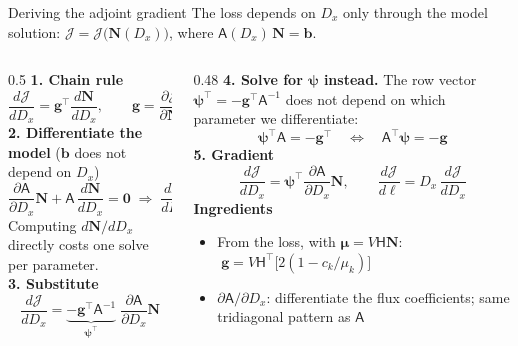 \documentclass[aspectratio=169,10pt]{beamer}
\newcommand{\J}{\mathcal{J}}
\newcommand{\A}{\mathsf{A}}
\newcommand{\N}{\mathbf{N}}
\begin{document}
\begin{frame}{Deriving the adjoint gradient}
\small
The loss depends on $D_x$ only through the model solution: $\J = \J\bigl(\N(D_x)\bigr)$, where $\A(D_x)\,\N = \mathbf{b}$.
\begin{columns}[T]
\begin{column}{0.5\textwidth}
\textbf{1. Chain rule}
\[
\frac{d\J}{dD_x} = \mathbf{g}^{\!\top}\frac{d\N}{dD_x},\qquad \mathbf{g} = \frac{\partial\J}{\partial\N}
\]
\textbf{2. Differentiate the model} ($\mathbf{b}$ does not depend on $D_x$)
\[
\frac{\partial\A}{\partial D_x}\N + \A\,\frac{d\N}{dD_x} = \mathbf{0}
\;\Rightarrow\;
\frac{d\N}{dD_x} = -\A^{-1}\frac{\partial\A}{\partial D_x}\N
\]
Computing $d\N/dD_x$ directly costs one solve per parameter.\\[0.4em]
\textbf{3. Substitute}
\[
\frac{d\J}{dD_x} = \underbrace{-\mathbf{g}^{\!\top}\A^{-1}}_{\bm\psi^{\!\top}}\;\frac{\partial\A}{\partial D_x}\N
\]
\end{column}
\begin{column}{0.48\textwidth}
\textbf{4. Solve for $\bm\psi$ instead.} The row vector $\bm\psi^{\!\top} = -\mathbf{g}^{\!\top}\A^{-1}$ does not depend on which parameter we differentiate:
\[
\bm\psi^{\!\top}\A = -\mathbf{g}^{\!\top}\quad\Longleftrightarrow\quad \A^{\!\top}\bm\psi = -\mathbf{g}
\]
\textbf{5. Gradient}
\[
\frac{d\J}{dD_x} = \bm\psi^{\!\top}\frac{\partial\A}{\partial D_x}\N,\qquad \frac{d\J}{d\ell} = D_x\,\frac{d\J}{dD_x}
\]
\textbf{Ingredients}
\begin{itemize}
\item From the loss, with $\bm\mu = V\mathsf{H}\N$: $\;\mathbf{g} = V\mathsf{H}^{\!\top}\bigl[2(1 - c_k/\mu_k)\bigr]$
\item $\partial\A/\partial D_x$: differentiate the flux coefficients; same tridiagonal pattern as $\A$
\end{itemize}
\end{column}
\end{columns}
\end{frame}
\end{document}
